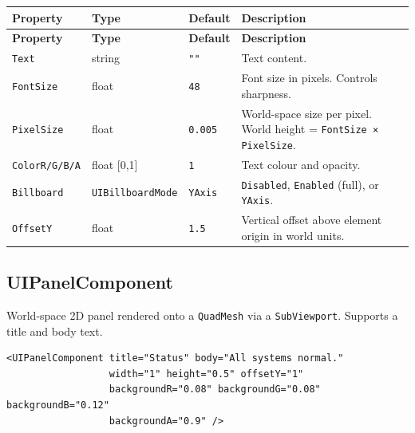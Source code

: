 \documentclass[11pt,a4paper]{article}
\begin{document}
\begin{longtable}{P{3.2cm} P{2.2cm} P{2.5cm} P{5.1cm}}
  \toprule
  \textbf{Property} & \textbf{Type} & \textbf{Default} & \textbf{Description} \\
  \midrule
  \endfirsthead
  \toprule
  \textbf{Property} & \textbf{Type} & \textbf{Default} & \textbf{Description} \\
  \midrule
  \endhead
  \texttt{Text} & string & \texttt{""} & Text content. \\
  \texttt{FontSize} & float & \texttt{48} &
    Font size in pixels. Controls sharpness. \\
  \texttt{PixelSize} & float & \texttt{0.005} &
    World-space size per pixel. World height = \texttt{FontSize × PixelSize}. \\
  \texttt{ColorR/G/B/A} & float [0,1] & \texttt{1} & Text colour and opacity. \\
  \texttt{Billboard} & \texttt{UIBillboardMode} & \texttt{YAxis} &
    \texttt{Disabled}, \texttt{Enabled} (full), or \texttt{YAxis}. \\
  \texttt{OffsetY} & float & \texttt{1.5} &
    Vertical offset above element origin in world units. \\
  \bottomrule
\end{longtable}

\subsection{UIPanelComponent}

World-space 2D panel rendered onto a \texttt{QuadMesh} via a
\texttt{SubViewport}.  Supports a title and body text.

\begin{lstlisting}
<UIPanelComponent title="Status" body="All systems normal."
                  width="1" height="0.5" offsetY="1"
                  backgroundR="0.08" backgroundG="0.08" backgroundB="0.12"
                  backgroundA="0.9" />
\end{lstlisting}
\end{document}
